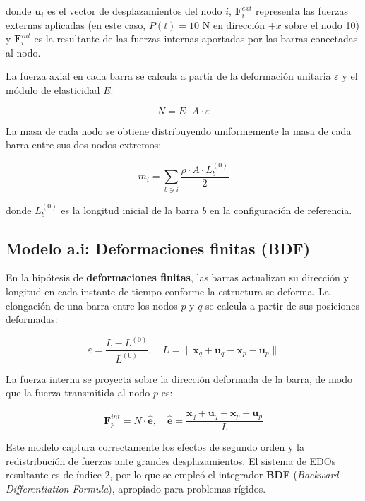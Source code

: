 \documentclass[12pt]{article}
\begin{document}
donde $\mathbf{u}_i$ es el vector de desplazamientos del nodo $i$, $\mathbf{F}_i^{ext}$ representa las fuerzas externas aplicadas (en este caso, $P(t) = 10$ N en dirección $+x$ sobre el nodo 10) y $\mathbf{F}_i^{int}$ es la resultante de las fuerzas internas aportadas por las barras conectadas al nodo.

La fuerza axial en cada barra se calcula a partir de la deformación unitaria $\varepsilon$ y el módulo de elasticidad $E$:

\begin{equation}
    N = E \cdot A \cdot \varepsilon
    \label{eq:fuerza_axial}
\end{equation}

La masa de cada nodo se obtiene distribuyendo uniformemente la masa de cada barra entre sus dos nodos extremos:

\begin{equation}
    m_i = \sum_{b \ni i} \frac{\rho \cdot A \cdot L_b^{(0)}}{2}
    \label{eq:masa}
\end{equation}

donde $L_b^{(0)}$ es la longitud inicial de la barra $b$ en la configuración de referencia.

\subsection{Modelo a.i: Deformaciones finitas (BDF)}

En la hipótesis de \textbf{deformaciones finitas}, las barras actualizan su dirección y longitud en cada instante de tiempo conforme la estructura se deforma. La elongación de una barra entre los nodos $p$ y $q$ se calcula a partir de sus posiciones deformadas:

\begin{equation}
    \varepsilon = \frac{L - L^{(0)}}{L^{(0)}}, \quad L = \|\mathbf{x}_q + \mathbf{u}_q - \mathbf{x}_p - \mathbf{u}_p\|
    \label{eq:eps_finita}
\end{equation}

La fuerza interna se proyecta sobre la dirección deformada de la barra, de modo que la fuerza transmitida al nodo $p$ es:

\begin{equation}
    \mathbf{F}_p^{int} = N \cdot \hat{\mathbf{e}}, \quad \hat{\mathbf{e}} = \frac{\mathbf{x}_q + \mathbf{u}_q - \mathbf{x}_p - \mathbf{u}_p}{L}
    \label{eq:fuerza_int_finita}
\end{equation}

Este modelo captura correctamente los efectos de segundo orden y la redistribución de fuerzas ante grandes desplazamientos. El sistema de EDOs resultante es de índice 2, por lo que se empleó el integrador \textbf{BDF} (\textit{Backward Differentiation Formula}), apropiado para problemas rígidos.
\end{document}
